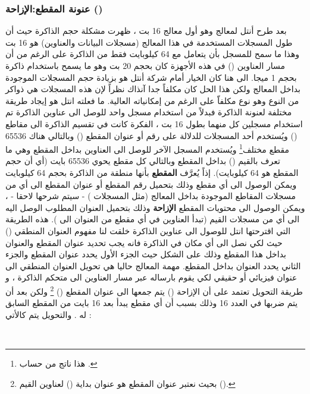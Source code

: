 \documentclass[document.tex]{subfiles}
\begin{document}
\subsubsection{عنونة المقطع:الإزاحة ()}
بعد طرح أنتل لمعالج  وهو أول معالج 16 بت ، ظهرت مشكلة حجم الذاكرة حيث أن طول المسجلات المستخدمة في هذا المعالج (مسجلات البيانات والعناوين) هو 16 بت وهذا ما سمح للمسجل بأن يتعامل مع  64 كيلوبايت فقط من الذاكرة على الرغم من أن مسار العناوين () في هذه الأجهزة  كان بحجم 20 بت وهو ما يسمح باستخدام ذاكرة بحجم 1 ميجا. الى هنا كان الخيار أمام شركة أنتل هو بزيادة حجم المسجلات الموجودة بداخل المعالج ولكن هذا الحل كان مكلفاً جدا آنذاك نظراً لإن هذه المسجلات هي ذواكر من النوع  وهو نوع مكلفاّ على الرغم من إمكانياته العالية. ما فعلته انتل هو إيجاد طريقة مختلفة لعنونة الذاكرة فبدلاً من استخدام مسجل واحد للوصل الى عناوين الذاكرة تم استخدام مسجلين كل منهما بطول 16 بت ، الفكرة كانت في تقسيم الذاكرة الى مقاطع () ويُستخدم أحد المسجلات للدلالة على رقم أو عنوان المقطع () وبالتالي هناك 65536 مقطع مختلف\footnote{هذا ناتج من حساب .} ويُستخدم المسجل الآخر للوصل الى العناوين بداخل المقطع وهي ما تعرف بالقيم () بداخل المقطع وبالتالي كل مقطع يحوي 65536 بايت (أي أن حجم المقطع هو 64 كيلوبايت).
إذاً يُعرَّف \textbf{المقطع } بأنها منطقة من الذاكرة بحجم 64 كيلوبايت ويمكن الوصول الى أي مقطع وذلك بتحميل رقم المقطع أو عنوان المقطع الى أي من مسجلات المقاطع الموجودة بداخل المعالج (مثل المسجلات ) - سيتم شرحها لاحقا - ، ويمكن الوصول الى محتويات المقطع \textbf{الإزاحة } وذلك بتحميل العنوان المطلوب الوصل اليه الى أي من مسجلات القيم (تبدأ العناوين في أي مقطع من العنوان  الى ). هذه الطريقة التي اقترحتها انتل للوصول الى عناوين الذاكرة خلقت لنا مفهوم العنوان المنطقي () حيث لكي نصل الى أي مكان في الذاكرة فانه يجب تحديد عنوان المقطع والعنوان بداخل هذا المقطع وذلك على الشكل  حيث الجزء الأول يحدد عنوان المقطع والجزء الثاني يحدد العنوان بداخل المقطع. مهمة المعالج حاليا هي تحويل العنوان المنطقي الى عنوان فيزيائي أو حقيقي لكي يقوم بارساله عبر مسار العناوين الى متحكم الذاكرة ، و طريقة التحويل تعتمد على أن الإزاحة () يتم جمعها الى عنوان المقطع () \footnote{بحيث نعتبر عنوان المقطع هو عنوان بداية () لعناوين القيم ().} ولكن بعد أن يتم ضربها في العدد 16 وذلك بسبب أن أي مقطع يبدأ بعد 16 بايت من المقطع السابق له . والتحويل يتم كالأتي :

\begin{english}
\\
\end{english} 
\end{document}
